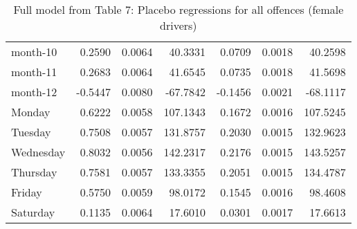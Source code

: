 \documentclass[10pt]{article}
\begin{document}
\begin{table}[ht]
\begin{tabular}{lrrrrrr}
  month-10 & 0.2590 & 0.0064 & 40.3331 & 0.0709 & 0.0018 & 40.2598 \\ 
  month-11 & 0.2683 & 0.0064 & 41.6545 & 0.0735 & 0.0018 & 41.5698 \\ 
  month-12 & -0.5447 & 0.0080 & -67.7842 & -0.1456 & 0.0021 & -68.1117 \\ 
  Monday & 0.6222 & 0.0058 & 107.1343 & 0.1672 & 0.0016 & 107.5245 \\ 
  Tuesday & 0.7508 & 0.0057 & 131.8757 & 0.2030 & 0.0015 & 132.9623 \\ 
  Wednesday & 0.8032 & 0.0056 & 142.2317 & 0.2176 & 0.0015 & 143.5257 \\ 
  Thursday & 0.7581 & 0.0057 & 133.3355 & 0.2051 & 0.0015 & 134.4787 \\ 
  Friday & 0.5750 & 0.0059 & 98.0172 & 0.1545 & 0.0016 & 98.4608 \\ 
  Saturday & 0.1135 & 0.0064 & 17.6010 & 0.0301 & 0.0017 & 17.6613 \\ 
   \hline
\end{tabular}
\caption{Full model from Table 7: Placebo regressions for all offences (female drivers)} 
\label{tab_7_all_pts_no_age_F}
\end{table}


\clearpage
\pagebreak



\end{document}
